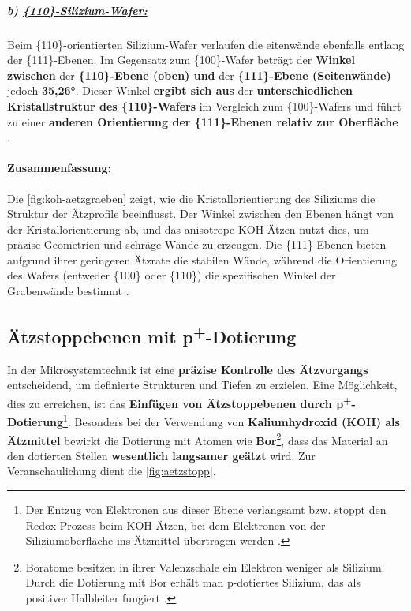 \documentclass{article} %
\begin{document}
\subparagraph{b) \uline{\{110\}-Silizium-Wafer:}} Beim \{110\}-orientierten Silizium-Wafer verlaufen die eitenwände ebenfalls entlang der \{111\}-Ebenen. Im Gegensatz zum \{100\}-Wafer beträgt der \textbf{Winkel zwischen} der \textbf{\{110\}-Ebene (oben) und} der \textbf{\{111\}-Ebene (Seitenwände)} jedoch \textbf{35,26°}. Dieser Winkel \textbf{ergibt sich aus} der \textbf{unterschiedlichen Kristallstruktur des \{110\}-Wafers} im Vergleich zum \{100\}-Wafers und führt zu einer \textbf{anderen Orientierung der \{111\}-Ebenen relativ zur Oberfläche} \cite{seidel1990, kittel2004}.

\paragraph{Zusammenfassung:} Die \autoref{fig:koh-aetzgraeben} zeigt, wie die Kristallorientierung des Siliziums die Struktur der Ätzprofile beeinflusst. Der Winkel zwischen den Ebenen hängt von der Kristallorientierung ab, und das anisotrope KOH-Ätzen nutzt dies, um präzise Geometrien und schräge Wände zu erzeugen. Die \{111\}-Ebenen bieten aufgrund ihrer geringeren Ätzrate die stabilen Wände, während die Orientierung des Wafers (entweder \{100\} oder \{110\}) die spezifischen Winkel der Grabenwände bestimmt \cite{madou2002, seidel1990, kittel2004}.





\subsection{Ätzstoppebenen mit p\textsuperscript{+}-Dotierung}

In der Mikrosystemtechnik ist eine \textbf{präzise Kontrolle des Ätzvorgangs} entscheidend, um definierte Strukturen und Tiefen zu erzielen. Eine Möglichkeit, dies zu erreichen, ist das \textbf{Einfügen von Ätzstoppebenen durch p\textsuperscript{+}-Dotierung}\footnote{Der Entzug von Elektronen aus dieser Ebene verlangsamt bzw. stoppt den Redox-Prozess beim KOH-Ätzen, bei dem Elektronen von der Siliziumoberfläche ins Ätzmittel übertragen werden \cite{madou2002}.}. Besonders bei der Verwendung von \textbf{Kaliumhydroxid (KOH) als Ätzmittel} bewirkt die Dotierung mit Atomen wie \textbf{Bor}\footnote{Boratome besitzen in ihrer Valenzschale ein Elektron weniger als Silizium. Durch die Dotierung mit Bor erhält man p-dotiertes Silizium, das als positiver Halbleiter fungiert \cite{madou2002}.}, dass das Material an den dotierten Stellen \textbf{wesentlich langsamer geätzt} wird. Zur Veranschaulichung dient die \autoref{fig:aetzstopp}.
\end{document}
